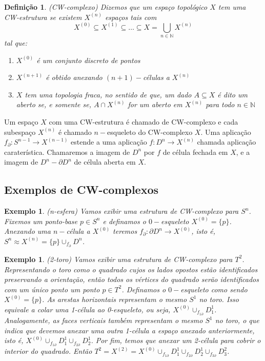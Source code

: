 \documentclass[12pt]{book}
\newtheorem{definicao}[teorema]{Definição}
\newtheorem{exemplo}[teorema]{Exemplo}
\newcommand{\celula}[2]{D^{#1}_{#2}}
\newcommand{\skeleton}[1]{X^{(#1)}}
\begin{document}
	\begin{definicao}
		(CW-complexo) Dizemos que um espaço topológico $X$ tem uma CW-estrutura se existem $\skeleton{n}$ espaços tais com 
		$$
		\skeleton{0} \subseteq \skeleton{1} \subseteq \dots \subseteq X = \bigcup \limits_{n\in \mathbb{N}} \skeleton{n}
		$$ 
		tal que:
		\begin{enumerate}
			\item $\skeleton{0}$ é um conjunto discreto de pontos
			\item $\skeleton{n+1}$ é obtido anexando $(n+1)-$células a $\skeleton{n}$
			\item $X$ tem uma topologia fraca, no sentido de que, um dado $A \subseteq X$ é dito um aberto se, e somente se, $A \cap \skeleton{n}$ for um aberto em $\skeleton{n}$ para todo $n \in \mathbb{N}$
		\end{enumerate}
	\end{definicao}
	
	Um espaço $X$ com uma CW-estrutura é chamado de CW-complexo e cada subespaço $\skeleton{n}$ é chamado $n-$esqueleto do CW-complexo $X$. Uma aplicação $f_{\partial}:S^{n-1} \to \skeleton{n-1}$ estende a uma aplicação $f:D^{n} \to \skeleton{n}$ chamada aplicação caraterística. Chamaremos a imagem de $D^{n}$ por $f$ de célula fechada em $X$, e a imagem de $D^{n} - \partial D^{n}$ de célula aberta em $X$.
	
	\subsection{Exemplos de CW-complexos}
	\begin{exemplo}
		(n-esfera) Vamos exibir uma estrutura de CW-complexo para $S^{n}$. Fixemos um ponto-base $p \in S^{n}$ e definamos o $0-$esqueleto $\skeleton{0}=\{p\}$. Anexando uma $n-$célula a $\skeleton{0}$ teremos $f_{\partial}: \partial D^{n} \to \skeleton{0}$, isto é, $S^{n} \approx \skeleton{n} = \{p\}\cup_{f_{\partial}} \celula{n}{}$.
	\end{exemplo}
	
	\begin{exemplo}
		(2-toro) Vamos exibir uma estrutura de CW-complexo para $T^{2}$. Representando o toro como o quadrado cujos os lados opostos estão identificados preservando a orientação, então todos os vértices do quadrado serão identificados com um único ponto um ponto $p \in T^{2}$. Definamos o $0-$esqueleto como sendo $\skeleton{0} = \{p\}$. As arestas horizontais representam o mesmo $S^{1}$ no toro. Isso equivale a colar uma 1-célula ao 0-esqueleto, ou seja, $\skeleton{0}\cup_{f_{1\partial}}\celula{1}{1}$. Analogamente, as faces verticais também representam o mesmo $S^{1}$ no toro, o que indica que devemos anexar uma outra 1-célula a espaço anexado anteriormente, isto é, $\skeleton{0}\cup_{f_{1\partial}}\celula{1}{1}\cup_{f_{2\partial}}\celula{1}{2}$. Por fim, temos que anexar um 2-célula para cobrir o interior do quadrado. Então $T^{2} =\skeleton{2} = \skeleton{0}\cup_{f_{1\partial}}\celula{1}{1}\cup_{f_{2\partial}}\celula{1}{2}\cup_{f_{3\partial}}\celula{2}{3}$.
	\end{exemplo}
	
\end{document}

